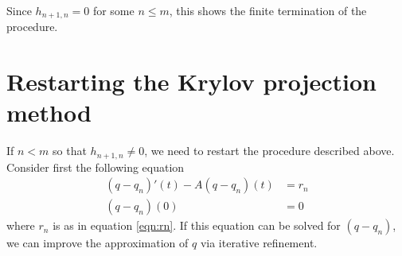 Since $h_{n+1,n} = 0$ for some $n \leq m$, this shows the finite termination of the procedure.


\section{Restarting the Krylov projection method} \label{sec:rest}
If $n < m$ so that $h_{n+1,n} \neq 0$, we need to restart the procedure described above. Consider first the following equation
\begin{equation}\label{eqn:restkry}
\begin{aligned}
 (q-q_n)'(t) -A (q-q_n)(t) &= r_n \\
(q-q_n)(0)& = 0
\end{aligned}
\end{equation}
where $r_n$ is as in equation \eqref{eqn:rn}. If this equation can be solved for $(q-q_n)$, we can improve the approximation of $q$ via iterative refinement.


